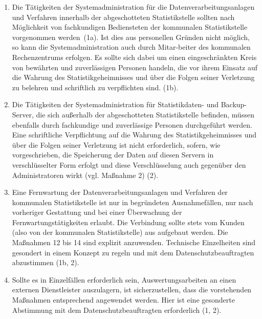 \begin{enumerate}[label=\arabic*.]
            \item Die Tätigkeiten der Systemadministration für die Datenverarbeitungsanlagen und Verfahren innerhalb der abgeschotteten Statistikstelle sollten nach Möglichkeit von fachkundigen Bediensteten der kommunalen Statistikstelle vorgenommen werden~(1a). Ist dies aus personellen Gründen nicht möglich, so kann die Systemadministration auch durch Mitar-beiter des kommunalen Rechenzentrums erfolgen. Es sollte sich dabei um einen eingeschränkten Kreis von bewährten und zuverlässigen Personen handeln, die vor ihrem Einsatz auf die Wahrung des Statistikgeheimnisses und über die Folgen seiner Verletzung zu belehren und schriftlich zu verpflichten sind. (1b).
            \item Die Tätigkeiten der Systemadministration für Statistikdaten- und Backup-Server, die sich außerhalb der abgeschotteten Statistikstelle befinden, müssen ebenfalls durch fachkundige und zuverlässige Personen durchgeführt werden. Eine schriftliche Verpflichtung auf die Wahrung des Statistikgeheimnisses und über die Folgen seiner Verletzung ist nicht erforderlich, sofern, wie vorgeschrieben, die Speicherung der Daten auf diesen Servern in verschlüsselter Form erfolgt und diese Verschlüsselung auch gegenüber den Administratoren wirkt (vgl. Maßnahme 2) (2).
            \item Eine Fernwartung der Datenverarbeitungsanlagen und Verfahren der kommunalen Statistikstelle ist nur in begründeten Ausnahmefällen, nur nach vorheriger Gestattung und bei einer Überwachung der Fernwartungstätigkeiten erlaubt. Die Verbindung sollte stets vom Kunden (also von der kommunalen Statistikstelle) aus aufgebaut werden. Die Maßnahmen 12 bis 14 sind explizit anzuwenden. Technische Einzelheiten sind gesondert in einem Konzept zu regeln und mit dem Datenschutzbeauftragten abzustimmen (1b, 2).
            \item Sollte es in Einzelfällen erforderlich sein, Auswertungsarbeiten an einen externen Dienstleister auszulagern, ist sicherzustellen, dass die vorstehenden Maßnahmen entsprechend angewendet werden. Hier ist eine gesonderte Abstimmung mit dem Datenschutzbeauftragten erforderlich (1, 2).
        \end{enumerate}
